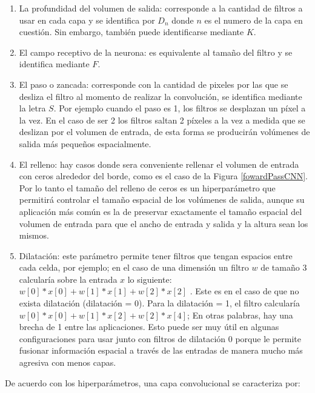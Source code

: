\begin{enumerate}
    \item La profundidad del volumen de salida: corresponde a la cantidad de filtros a usar en cada capa y se identifica por $D_{n}$ donde $n$ es el numero de la capa en cuestión. Sin embargo, también puede identificarse mediante $K$.
    \item El campo receptivo de la neurona: es equivalente al tamaño del filtro y se identifica mediante $F$.
    \item El paso o zancada: corresponde con la cantidad de pixeles por las que se desliza el filtro al momento de realizar la convolución, se identifica mediante la letra $S$. Por ejemplo cuando el paso es 1, los filtros se desplazan un píxel a la vez. En el caso de ser 2 los filtros saltan 2 píxeles a la vez a medida que se deslizan por el volumen de entrada, de esta forma se producirán volúmenes de salida más pequeños espacialmente.
    \item El relleno: hay casos donde sera conveniente rellenar el volumen de entrada con ceros alrededor del borde, como es el caso de la Figura \ref{fowardPassCNN}. Por lo tanto el tamaño del relleno de ceros es un hiperparámetro que  permitirá controlar el tamaño espacial de los volúmenes de salida, aunque su aplicación más común es la de preservar exactamente el tamaño espacial del volumen de entrada para que el ancho de entrada y salida y la altura sean los mismos.
    \item Dilatación: este parámetro permite tener filtros que tengan espacios entre cada celda, por ejemplo; en el caso de una dimensión un filtro $w$ de tamaño 3 calcularía sobre la entrada $x$ lo siguiente:  $w [0] * x [0] + w [1] * x [1] + w [2] * x [2]$ . Este es en el caso de que no exista dilatación (dilatación = 0). Para la dilatación = 1, el filtro calcularía $w [0] * x [0] + w [1] * x [2] + w [2] * x [4]$; En otras palabras, hay una brecha de 1 entre las aplicaciones.  Esto puede ser muy útil en algunas configuraciones para usar junto con filtros de dilatación 0 porque le permite fusionar información espacial a través de las entradas de manera mucho más agresiva con menos capas.
\end{enumerate}
De acuerdo con los hiperparámetros, una capa convolucional se caracteriza por:
